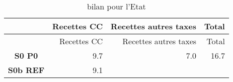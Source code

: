 \begin{longtable}[]{@{}crrr@{}}
\caption{bilan pour l'Etat}\tabularnewline
\toprule
\begin{minipage}[b]{0.21\columnwidth}\centering\strut
~\strut
\end{minipage} & \begin{minipage}[b]{0.17\columnwidth}\raggedleft\strut
Recettes CC\strut
\end{minipage} & \begin{minipage}[b]{0.30\columnwidth}\raggedleft\strut
Recettes autres taxes\strut
\end{minipage} & \begin{minipage}[b]{0.09\columnwidth}\raggedleft\strut
Total\strut
\end{minipage}\tabularnewline
\midrule
\endfirsthead
\toprule
\begin{minipage}[b]{0.21\columnwidth}\centering\strut
~\strut
\end{minipage} & \begin{minipage}[b]{0.17\columnwidth}\raggedleft\strut
Recettes CC\strut
\end{minipage} & \begin{minipage}[b]{0.30\columnwidth}\raggedleft\strut
Recettes autres taxes\strut
\end{minipage} & \begin{minipage}[b]{0.09\columnwidth}\raggedleft\strut
Total\strut
\end{minipage}\tabularnewline
\midrule
\endhead
\begin{minipage}[t]{0.21\columnwidth}\centering\strut
\textbf{S0 P0}\strut
\end{minipage} & \begin{minipage}[t]{0.17\columnwidth}\raggedleft\strut
9.7\strut
\end{minipage} & \begin{minipage}[t]{0.30\columnwidth}\raggedleft\strut
7.0\strut
\end{minipage} & \begin{minipage}[t]{0.09\columnwidth}\raggedleft\strut
16.7\strut
\end{minipage}\tabularnewline
\begin{minipage}[t]{0.21\columnwidth}\centering\strut
\textbf{S0b REF}\strut
\end{minipage} & \begin{minipage}[t]{0.17\columnwidth}\raggedleft\strut
9.1\strut
\end{minipage} & \begin{minipage}[t]{0.30\columnwidth}\raggedleft\strut

\end{minipage}
\end{longtable}
